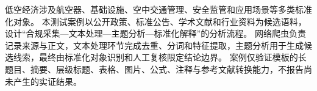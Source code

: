 \begin{cnabstract}
低空经济涉及航空器、基础设施、空中交通管理、安全监管和应用场景等多类标准化对象。
本测试案例以公开政策、标准公告、学术文献和行业资料为候选语料，设计“合规采集—文本处理—主题分析—标准化解释”的分析流程。
网络爬虫负责记录来源与正文，文本处理环节完成去重、分词和特征提取，主题分析用于生成候选线索，最终由标准化对象识别和人工复核限定结论边界。
案例仅验证模板的长题目、摘要、层级标题、表格、图片、公式、注释与参考文献转换能力，不报告尚未产生的实证结果。

\end{cnabstract}
